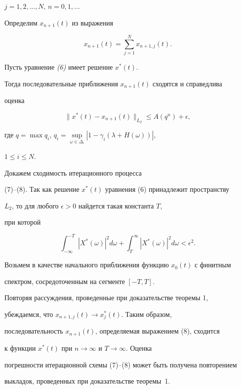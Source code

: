 $j=1,2,\dotsc,N$, $n=0,1,\dotsc$





Определим $x_{n+1} (t)$ из выражения


\begin{equation}


x_{n+1} (t)=\sum_{j=1}^ N x_{n+1,j}(t).


\end{equation}





\begin{thm}


Пусть уравнение {\em (6)} имеет решение $x^* (t)$.


Тогда последовательные приближения $x_{n+1} (t)$ сходятся и справедлива


оценка


$$


\|x^*(t)-x_{n+1}(t)\|_{L_2}\le A(q^n)+\epsilon,


$$


где $q=\max q_i$, $q_i=\sup\limits_{\omega\in\Delta_i}


|1-\gamma_i(\lambda+H(\omega))|$,


$1\le i\le N$.


\end{thm}





\begin{pf} Докажем сходимость итерационного процесса


(7)--(8). Так как решение $x^* (t)$ уравнения (6) принадлежит пространству


$L_2$, то для любого $\epsilon>0 $ найдется такая константа $T$,


при которой


$$


\int_{-\infty}^{-T}|X^*(\omega)


|^2 d\omega+\int_T^\infty|X^*(\omega)|^2 d\omega<\epsilon^2.


$$


Возьмем в качестве начального приближения функцию $x_0(t)$ с финитным


спектром, сосредоточенным на сегменте $[-T,T]$.





Повторяя рассуждения, проведенные при доказательстве теоремы 1,


убеждаемся, что \linebreak $x_{n+1,j}(t) \to x_j^*(t)$. Таким образом,


последовательность $ x_{n+1}(t)$, определяемая выражением (8), сходится


к функции $x^*(t)$ при $n\to \infty $ и $ T\to\infty$. Оценка


погрешности итерационной схемы (7)--(8) может быть получена повторением


выкладок, проведенных при доказательстве теоремы~1.


\end{pf}





